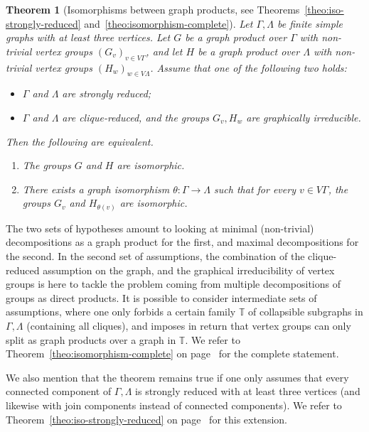 \documentclass[a4paper,english,11pt]{article}
\newtheorem{theo}[de]{Theorem}
\theoremstyle{definition}
\theoremstyle{remark}
\begin{document}
\begin{theo}[Isomorphisms between graph products, see Theorems~\ref{theo:iso-strongly-reduced} and~\ref{theo:isomorphism-complete}]
\label{theo:isomorphism}
Let $\Gamma,\Lambda$ be finite simple graphs with at least three vertices. Let $G$ be a graph product over $\Gamma$ with non-trivial vertex groups $(G_v)_{v\in V\Gamma}$, and let $H$ be a graph product over $\Lambda$ with non-trivial vertex groups $(H_w)_{w\in V\Lambda}$. Assume that one of the following two holds:
\begin{itemize}
\item $\Gamma$ and $\Lambda$ are strongly reduced;
    \item $\Gamma$ and $\Lambda$ are clique-reduced, and the groups $G_v,H_w$ are graphically irreducible.
\end{itemize}
Then the following are equivalent.
\begin{enumerate}
    \item The groups $G$ and $H$ are isomorphic.
    \item There exists a graph isomorphism $\theta:\Gamma\to\Lambda$ such that for every $v\in V\Gamma$, the groups $G_v$ and $H_{\theta(v)}$ are isomorphic.
\end{enumerate}
\end{theo}

The two sets of hypotheses amount to looking at minimal (non-trivial) decompositions as a graph product for the first, and maximal decompositions for the second. In the second set of assumptions, the combination of the clique-reduced assumption on the graph, and the graphical irreducibility of vertex groups is here to tackle the problem coming from multiple decompositions of groups as direct products. It is possible to consider intermediate sets of assumptions, where one only forbids a certain family $\mathbb{T}$ of collapsible subgraphs in $\Gamma,\Lambda$ (containing all cliques), and imposes in return that vertex groups can only split as graph products over a graph in $\mathbb{T}$. We refer to Theorem~\ref{theo:isomorphism-complete} on page~\pageref{theo:isomorphism-complete} for the complete statement.

We also mention that the theorem remains true if one only assumes that every connected component of $\Gamma,\Lambda$ is strongly reduced with at least three vertices (and likewise with join components instead of connected components). We refer to Theorem~\ref{theo:iso-strongly-reduced} on page~\pageref{theo:iso-strongly-reduced} for this extension.
\end{document}
